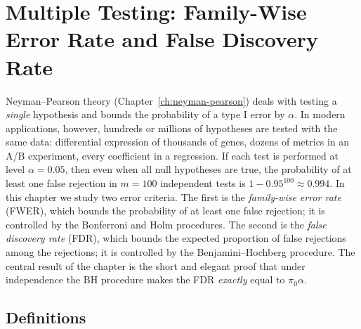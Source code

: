 \documentclass[main.tex]{subfiles}
\begin{document}
\chapter{Multiple Testing: Family-Wise Error Rate and False Discovery Rate}\label{ch:coklu-test}

Neyman--Pearson theory (Chapter~\ref{ch:neyman-pearson}) deals with testing a \emph{single} hypothesis and bounds the probability of a type I error by $\alpha$. In modern applications, however, hundreds or millions of hypotheses are tested with the same data: differential expression of thousands of genes, dozens of metrics in an A/B experiment, every coefficient in a regression. If each test is performed at level $\alpha=0.05$, then even when all null hypotheses are true, the probability of at least one false rejection in $m=100$ independent tests is $1-0.95^{100}\approx0.994$. In this chapter we study two error criteria. The first is the \emph{family-wise error rate} (FWER), which bounds the probability of at least one false rejection; it is controlled by the Bonferroni and Holm procedures. The second is the \emph{false discovery rate} (FDR), which bounds the expected proportion of false rejections among the rejections; it is controlled by the Benjamini--Hochberg procedure. The central result of the chapter is the short and elegant proof that under independence the BH procedure makes the FDR \emph{exactly} equal to $\pi_0\alpha$.

\section{Definitions}
\end{document}
